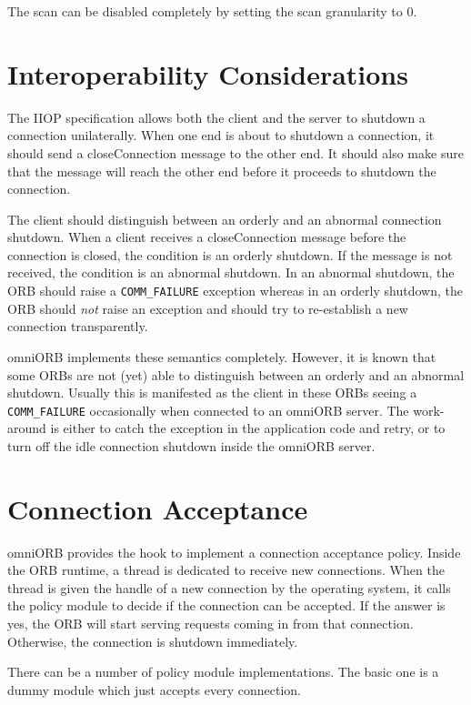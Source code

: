 \documentclass[11pt,twoside,a4paper]{book}
\newcommand{\code}[1]{\texttt{#1}}
\begin{document}
The scan can be disabled completely by setting the scan granularity to
0.

\section{Interoperability Considerations}

The IIOP specification allows both the client and the server to
shutdown a connection unilaterally. When one end is about to shutdown
a connection, it should send a closeConnection message to the other
end. It should also make sure that the message will reach the other
end before it proceeds to shutdown the connection.

The client should distinguish between an orderly and an abnormal
connection shutdown. When a client receives a closeConnection message
before the connection is closed, the condition is an orderly shutdown.
If the message is not received, the condition is an abnormal shutdown.
In an abnormal shutdown, the ORB should raise a \code{COMM\_FAILURE}
exception whereas in an orderly shutdown, the ORB should \emph{not}
raise an exception and should try to re-establish a new connection
transparently.

omniORB implements these semantics completely. However, it is known
that some ORBs are not (yet) able to distinguish between an orderly
and an abnormal shutdown. Usually this is manifested as the client in
these ORBs seeing a \code{COMM\_FAILURE} occasionally when connected
to an omniORB server. The work-around is either to catch the exception
in the application code and retry, or to turn off the idle connection
shutdown inside the omniORB server.


\section{Connection Acceptance}
\label{sec_accept}

omniORB provides the hook to implement a connection acceptance policy.
Inside the ORB runtime, a thread is dedicated to receive new
connections. When the thread is given the handle of a new connection
by the operating system, it calls the policy module to decide if the
connection can be accepted. If the answer is yes, the ORB will start
serving requests coming in from that connection. Otherwise, the
connection is shutdown immediately.

There can be a number of policy module implementations. The basic one
is a dummy module which just accepts every connection.
\end{document}
